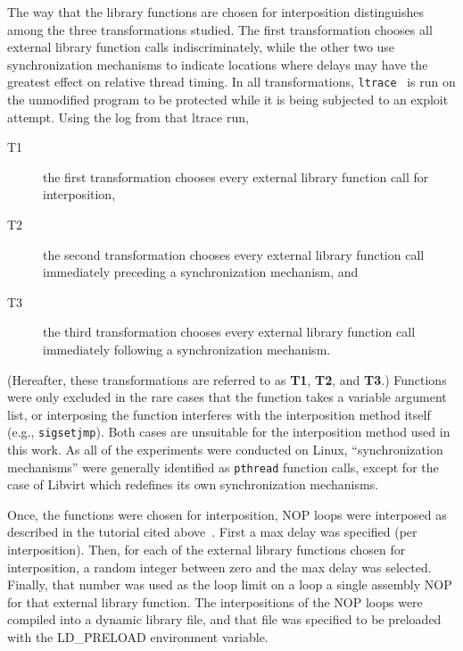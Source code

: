 The way that the library functions are chosen for interposition distinguishes among the three transformations studied.
The first transformation chooses all external library function calls indiscriminately, while the other two use synchronization mechanisms to indicate locations where delays may have the greatest effect on relative thread timing.
In all transformations, \texttt{ltrace}~\cite{cespedesltrace} is run on the unmodified program to be protected while it is being subjected to an exploit attempt.
Using the log from that ltrace run,
\begin{description}
	\item[T1] the first transformation chooses every external library function call for interposition,
	\item[T2] the second transformation chooses every external library function call immediately preceding a synchronization mechanism, and
	\item[T3] the third transformation chooses every external library function call immediately following a synchronization mechanism.
\end{description}
(Hereafter, these transformations are referred to as \textbf{T1}, \textbf{T2}, and \textbf{T3}.)
Functions were only excluded in the rare cases that the function takes a
variable argument list, or interposing the function interferes with the
interposition method itself (e.g., \texttt{sigsetjmp}).
Both cases are unsuitable for the interposition method used in this work.
As all of the experiments were conducted on Linux, ``synchronization
mechanisms'' were generally identified as \texttt{pthread} function calls, except for the case of Libvirt which redefines its own synchronization mechanisms.

Once, the functions were chosen for interposition, NOP loops were interposed as described in the tutorial cited above~\cite{Conrod2009}.
First a max delay was specified (per interposition).
Then, for each of the external library functions chosen for interposition, a random integer between zero and the max delay was selected.
Finally, that number was used as the loop limit on a loop a single assembly NOP for that external library function.
The interpositions of the NOP loops were compiled into a dynamic library file, and that file was specified to be preloaded with the LD\_PRELOAD environment variable.

